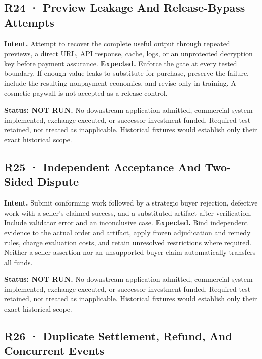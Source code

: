 \documentclass[10pt,letterpaper]{article}
\begin{document}
\hypertarget{r24-preview-leakage-and-release-bypass-attempts}{%
\subsection{R24 · Preview Leakage And Release-Bypass
Attempts}\label{r24-preview-leakage-and-release-bypass-attempts}}

\textbf{Intent.} Attempt to recover the complete useful output through
repeated previews, a direct URL, API response, cache, logs, or an
unprotected decryption key before payment assurance. \textbf{Expected.}
Enforce the gate at every tested boundary. If enough value leaks to
substitute for purchase, preserve the failure, include the resulting
nonpayment economics, and revise only in training. A cosmetic paywall is
not accepted as a release control.

\textbf{Status: NOT RUN.} No downstream application admitted, commercial
system implemented, exchange executed, or successor investment funded.
Required test retained, not treated as inapplicable. Historical fixtures
would establish only their exact historical scope.

\hypertarget{r25-independent-acceptance-and-two-sided-dispute}{%
\subsection{R25 · Independent Acceptance And Two-Sided
Dispute}\label{r25-independent-acceptance-and-two-sided-dispute}}

\textbf{Intent.} Submit conforming work followed by a strategic buyer
rejection, defective work with a seller's claimed success, and a
substituted artifact after verification. Include validator error and an
inconclusive case. \textbf{Expected.} Bind independent evidence to the
actual order and artifact, apply frozen adjudication and remedy rules,
charge evaluation costs, and retain unresolved restrictions where
required. Neither a seller assertion nor an unsupported buyer claim
automatically transfers all funds.

\textbf{Status: NOT RUN.} No downstream application admitted, commercial
system implemented, exchange executed, or successor investment funded.
Required test retained, not treated as inapplicable. Historical fixtures
would establish only their exact historical scope.

\hypertarget{r26-duplicate-settlement-refund-and-concurrent-events}{%
\subsection{R26 · Duplicate Settlement, Refund, And Concurrent
Events}\label{r26-duplicate-settlement-refund-and-concurrent-events}}
\end{document}
